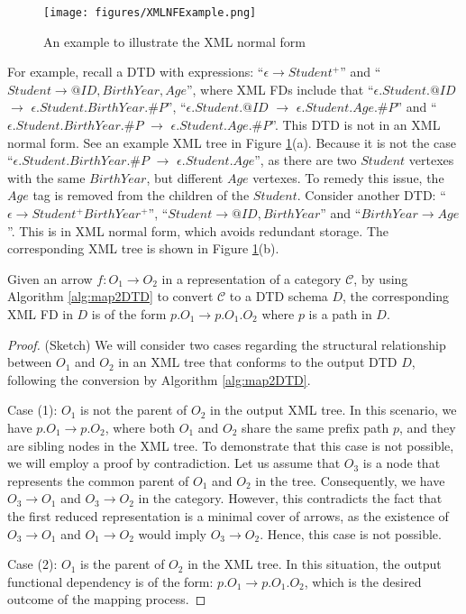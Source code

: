 \begin{figure}
\centering
\texttt{[image: figures/XMLNFExample.png]}
\caption{An example to illustrate the XML normal form} \label{fig:XMLNFExample}
\end{figure}

\begin{example} For example, recall a DTD with expressions: ``$\epsilon \to Student^+$'' and ``$Student \to @ID, BirthYear, Age$'', where XML FDs include that ``$\epsilon$.$Student.@ID$ $\to$ $\epsilon$.$Student.BirthYear.\#P$'',  ``$\epsilon$.$Student.@ID$ $\to$ $\epsilon$.$Student.Age.\#P$'' and ``$\epsilon.Student.BirthYear.\#P$ $\to$ $\epsilon.Student.Age.\#P$''. This DTD is not in an XML normal form. See an example XML tree in Figure \ref{fig:XMLNFExample}(a). Because it is not the case ``$\epsilon.Student.BirthYear.\#P$ $\to$ $\epsilon.Student.Age$'', as there are two $Student$ vertexes with the same $BirthYear$, but different $Age$ vertexes.  To remedy this issue, the $Age$ tag is removed from the children of the $Student$. Consider another DTD: ``$\epsilon \to Student^+ BirthYear^+$'', ``$Student \to @ID, BirthYear$'' and ``$BirthYear \to Age$''. This is in XML normal form, which avoids redundant storage. The corresponding XML  tree is shown in Figure \ref{fig:XMLNFExample}(b).
\end{example}


\begin{lemma}
Given an arrow $f: O_1 \to O_2$ in a representation of a category $\mathcal{C}$, by using Algorithm  \ref{alg:map2DTD} to convert $\mathcal{C}$ to a DTD schema $D$, the corresponding XML FD in $D$ is of the form $p.O_1 \to p.O_1.O_2$  where $p$ is a  path in $D$.
\label{lem:NFPrepare}\end{lemma}

\begin{proof} (Sketch)
We will consider two cases regarding the structural relationship between $O_1$ and $O_2$ in an XML tree that conforms to the output DTD $D$, following the conversion by Algorithm \ref{alg:map2DTD}.

Case (1): $O_1$ is not the parent of $O_2$ in the output XML tree. In this scenario, we have $p.O_1 \to p.O_2$, where both $O_1$ and $O_2$ share the same prefix path $p$, and they are sibling nodes in the XML tree. To demonstrate that this case is not possible, we will employ a proof by contradiction. Let us assume that $O_3$ is a node that represents the common parent of $O_1$ and $O_2$ in the tree. Consequently, we have $O_3 \to O_1$ and $O_3 \to O_2$ in the category. However, this contradicts the fact that the first reduced representation is a minimal cover of arrows, as the existence of $O_3 \to O_1$ and $O_1 \to O_2$ would imply $O_3 \to O_2$. Hence, this case is not possible.

Case (2): $O_1$ is the parent of $O_2$ in the XML tree.
In this situation, the output functional dependency  is of the form: $p.O_1 \to p.O_1.O_2$, which is the desired outcome of the mapping process.

\end{proof}

